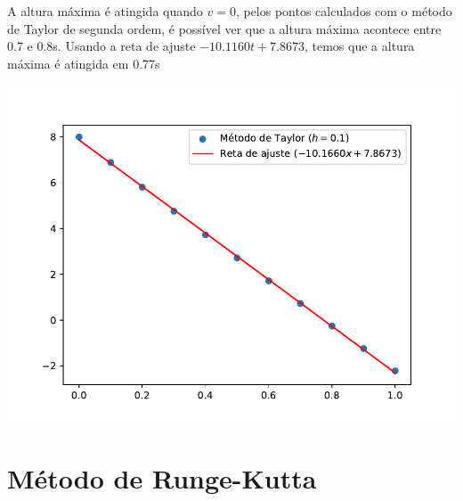 \documentclass[a4paper, 11pt]{report}
\begin{document}
\begin{enumerate}[leftmargin=*]
\begin{enumerate}[leftmargin=*, label=\alph*.]
        \begin{minipage}{0.42\columnwidth}
            A altura máxima é atingida quando $v = 0$, pelos pontos calculados com o método de Taylor de segunda ordem, é possível ver que a altura máxima acontece entre 0.7 e 0.8s. Usando a reta de ajuste $-10.1160t + 7.8673$, temos que a altura máxima é atingida em 0.77s 
        \end{minipage}
        \hfill
        \begin{minipage}{0.53\columnwidth}
            \includegraphics[width=\columnwidth]{../metodo de taylor/q12.pdf}
        \end{minipage}
    \end{enumerate}
\end{enumerate}

\section{Método de Runge-Kutta}
\end{document}

